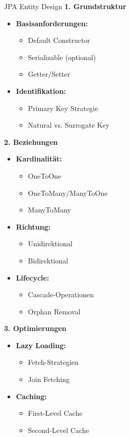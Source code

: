 \begin{KR}{JPA Entity Design}
\textbf{1. Grundstruktur}
\begin{itemize}
    \item \textbf{Basisanforderungen:}
    \begin{itemize}
        \item Default Constructor
        \item Serializable (optional)
        \item Getter/Setter
    \end{itemize}
    \item \textbf{Identifikation:}
    \begin{itemize}
        \item Primary Key Strategie
        \item Natural vs. Surrogate Key
    \end{itemize}
\end{itemize}

\textbf{2. Beziehungen}
\begin{itemize}
    \item \textbf{Kardinalität:}
    \begin{itemize}
        \item OneToOne
        \item OneToMany/ManyToOne
        \item ManyToMany
    \end{itemize}
    \item \textbf{Richtung:}
    \begin{itemize}
        \item Unidirektional
        \item Bidirektional
    \end{itemize}
    \item \textbf{Lifecycle:}
    \begin{itemize}
        \item Cascade-Operationen
        \item Orphan Removal
    \end{itemize}
\end{itemize}

\textbf{3. Optimierungen}
\begin{itemize}
    \item \textbf{Lazy Loading:}
    \begin{itemize}
        \item Fetch-Strategien
        \item Join Fetching
    \end{itemize}
    \item \textbf{Caching:}
    \begin{itemize}
        \item First-Level Cache
        \item Second-Level Cache
    \end{itemize}
\end{itemize}
\end{KR}




